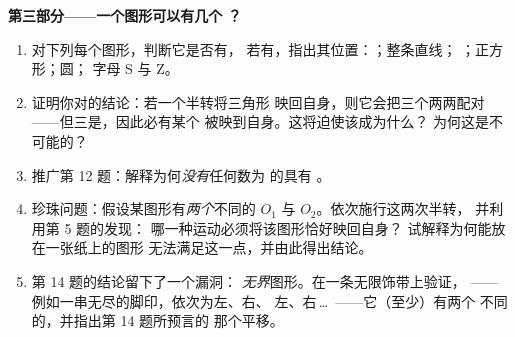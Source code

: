 \begin{problem}
\medskip
\noindent\textbf{第三部分——一个图形可以有几个
？}
\begin{enumerate}[resume]
  \item 对下列每个图形，判断它是否有，
        若有，指出其位置：；整条直线；
        ；正方形；圆；
        字母 S 与 Z。
  \item 证明你对的结论：若一个半转将三角形
        映回自身，则它会把三个两两配对
        ——但三是，因此必有某个
        被映到自身。这将迫使该成为什么？
        为何这是不可能的？
  \item 推广第 12 题：解释为何\emph{没有}任何数为
        的具有
        。
  \item 珍珠问题：假设某图形有\emph{两个}不同的
         $O_1$ 与 $O_2$。依次施行这两次半转，
        并利用第 5 题的发现：
        哪一种运动必须将该图形恰好映回自身？
        试解释为何能放在一张纸上的图形
        无法满足这一点，并由此得出结论。
  \item 第 14 题的结论留下了一个漏洞：
        \emph{无界}图形。在一条无限饰带上验证，
        ——例如一串无尽的脚印，依次为左、右、
        左、右\,\dots\ ——它（至少）有两个
        不同的，并指出第 14 题所预言的
        那个平移。
\end{enumerate}
\end{problem}
